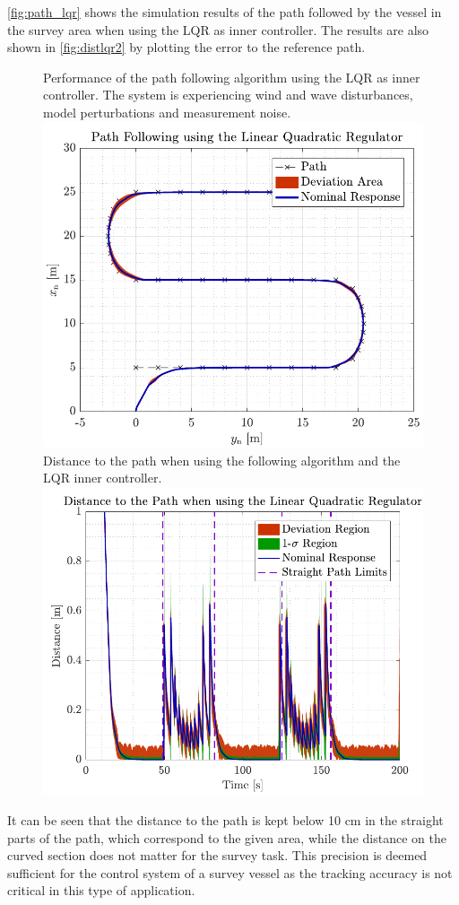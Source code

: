 \autoref{fig:path_lqr} shows the simulation results of the path followed by the vessel in the survey area when using the LQR as inner controller. The results are also shown in \autoref{fig:distlqr2} by plotting the error to the reference path.
\begin{figure}[H]
    \captionbox  
    {            
        Performance of the path following algorithm using the LQR as inner controller. The system is experiencing wind and wave disturbances, model perturbations and measurement noise.
        \label{fig:path_lqr}                               
    }                                                                
    {                                                                 
        \includegraphics[width=.45\textwidth]{figures/path_lqr}    
    }                                                                  
    \hspace{5pt}                                                        
    \captionbox 
    {       
        Distance to the path when using the following algorithm and the LQR inner controller.                                                                  %
        \label{fig:distlqr2}                                  
    }                                                                          
    {                                                                            
        \includegraphics[width=.45\textwidth]{figures/dist_lqr}          
    }                                                                            
\end{figure}
It can be seen that the distance to the path is kept below 10 cm in the straight parts of the path, which correspond to the given area, while the distance on the curved section does not matter for the survey task. This precision is deemed sufficient for the control system of a survey vessel as the tracking accuracy is not critical in this type of application.

